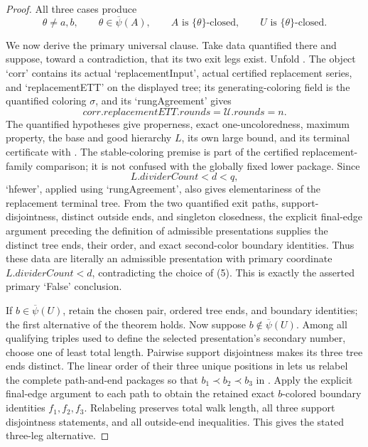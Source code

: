\begin{proof}
All three cases produce
\[
 \theta\ne a,b,\qquad
 \theta\in\overline\psi(A),\qquad
 A\text{ is }\{\theta\}\text{-closed},\qquad
 U\text{ is }\{\theta\}\text{-closed}.                       \tag{15}
\]

We now derive the primary universal clause.  Take data quantified there
and suppose, toward a contradiction, that its two exit legs exist.
Unfold .  The object
`corr' contains its actual `replacementInput', actual certified
replacement series, and `replacementETT' on the displayed tree; its
generating-coloring field is the quantified coloring $\sigma$, and its
`rungAgreement' gives
\[
 \mathit{corr.replacementETT.rounds}=\mathcal U.\mathit{rounds}=n.
\]
The quantified hypotheses give properness, exact one-uncoloredness,
maximum property, the base and good hierarchy $L$, its own large bound,
and its terminal certificate with
.  The stable-coloring premise is
part of the certified replacement-family comparison; it is not confused
with the globally fixed lower package.  Since
\[
 L.\mathit{dividerCount}<d<q,
\]
`hfewer', applied using `rungAgreement', also gives elementariness of the
replacement terminal tree.  From the two quantified exit paths,
support-disjointness, distinct outside ends, and singleton closedness,
the explicit final-edge argument preceding the definition of admissible
presentations supplies the distinct tree ends, their order, and exact
second-color boundary identities.  Thus these data are literally an
admissible presentation with primary coordinate
$L.\mathit{dividerCount}<d$, contradicting the choice of (5).  This is
exactly the asserted primary `False' conclusion.

If $b\in\overline\psi(U)$, retain the chosen pair, ordered tree ends, and
boundary identities; the first alternative of the theorem holds.  Now
suppose $b\notin\overline\psi(U)$.  Among all qualifying triples used to
define the selected presentation's secondary number, choose one of least
total length.  Pairwise support disjointness makes its three tree ends
distinct.  The linear order of their three unique positions in
 lets us relabel the complete path-and-end packages
so that $b_1\prec b_2\prec b_3$ in
.  Apply the explicit final-edge argument to
each path to obtain the retained exact $b$-colored boundary identities
$f_1,f_2,f_3$.  Relabeling preserves total walk length, all three support
disjointness statements, and all outside-end inequalities.  This gives
the stated three-leg alternative.


\end{proof}
